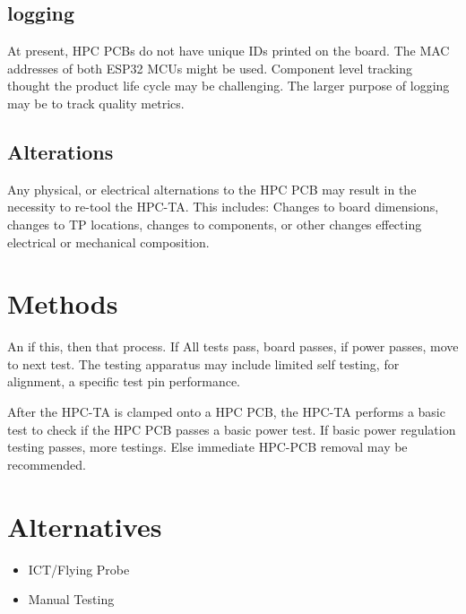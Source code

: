 \documentclass[]{article}
\begin{document}
	\subsection*{logging} At present, HPC PCBs do not have unique IDs printed on the board.
	The MAC addresses of both ESP32 MCUs might be used. Component level tracking thought the product life cycle may be challenging. The larger purpose of logging may be to track quality metrics. 
	\subsection*{Alterations}
	Any physical, or electrical alternations to the HPC PCB may result in the necessity to re-tool the HPC-TA. This includes: Changes to board dimensions, changes to TP locations, changes to components, or other changes effecting electrical or mechanical composition. 
	
	
	\section*{Methods}
	An if this, then that process. If All tests pass, board passes, if power passes, move to next test.
	The testing apparatus may include limited self testing, for alignment, a specific test pin performance.
	
	
	After the HPC-TA is clamped onto a HPC PCB, the HPC-TA performs a basic test to check if the HPC PCB passes a basic power test. If basic power regulation testing passes, more testings. Else immediate HPC-PCB removal may be recommended. 
	
	
	
	\section*{Alternatives}
	\begin{itemize}
		\item ICT/Flying Probe
        \item Manual Testing
    \end{itemize}     
\end{document}
